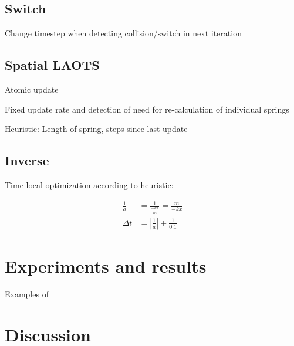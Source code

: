 \documentclass[twoside]{article}
\providecommand{\abs}[1]{\left \lvert #1 \right \rvert}
\begin{document}
\begin{multicols}{2}
\subsection{Switch}
Change timestep when detecting collision/switch in next iteration

\subsection{Spatial LAOTS}
Atomic update

Fixed update rate and detection of need for re-calculation of individual springs

Heuristic: Length of spring, steps since last update

\subsection{Inverse}
Time-local optimization according to heuristic:

\begin{align}
    \frac{1}{a} &= \frac{1}{\frac{-kx}{m}} = \frac{m}{-kx} \\
    \Delta t &= \abs{\frac{1}{a}} + \frac{1}{0.1}
\end{align}


\section{Experiments and results}

Examples of



\section{Discussion}


\end{multicols}
\end{document}
